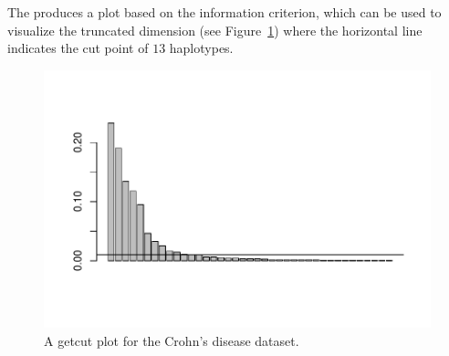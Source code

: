 The  produces a plot based on the information
criterion, which can be used to visualize the truncated dimension (see
Figure~\ref{fig:getcut}) where the horizontal line indicates the cut point
of $13$ haplotypes.
\begin{figure}[h]
\begin{center}
\includegraphics[width=6.0in]{./phyclust-include/f-getcut}
\caption{A getcut plot for the Crohn's disease dataset.}
\label{fig:getcut}
\end{center}
\end{figure}
